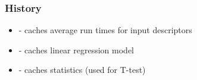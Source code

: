 \documentclass[12pt,a4paper]{report}
\let\openright=\clearpage
\begin{document}
\subsubsection{History}
\begin{itemize}
	\item {} - caches average run times for input descriptors
	\item {} - caches linear regression model
	\item {} - caches statistics (used for T-test)
\end{itemize}

\openright
\end{document}
